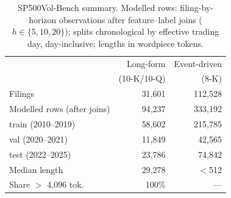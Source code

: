 \begin{table}[t]
\centering
{\small
\begin{tabular}{lrr}
\toprule
 & Long-form & Event-driven \\
 & (10-K/10-Q) & (8-K) \\
\midrule
Filings & 31{,}601 & 112{,}528 \\
Modelled rows (after joins) & 94{,}237 & 333{,}192 \\
\quad train (2010--2019) & 58{,}602 & 215{,}785 \\
\quad val (2020--2021) & 11{,}849 & 42{,}565 \\
\quad test (2022--2025) & 23{,}786 & 74{,}842 \\
\midrule
Median length & 29{,}278 & $<$512 \\
Share $>$ 4{,}096 tok. & 100\% & --- \\
\bottomrule
\end{tabular}
}
\caption{SP500Vol-Bench summary. Modelled rows: filing-by-horizon observations after feature--label joins \mbox{($h\in\{5,10,20\}$)}; splits chronological by effective trading day, day-inclusive; lengths in wordpiece tokens.}
\label{tab:dataset}
\end{table}
